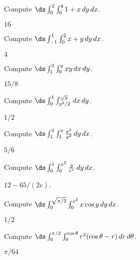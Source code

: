 \begin{exercises}

\begin{exercise} Compute $\ds \int_{0}^{2}\int_{0}^{4} 1+x \,dy\,dx$.
\begin{answer} $16$
\end{answer}\end{exercise}

\begin{exercise} Compute $\ds \int_{-1}^{1}\int_{0}^{2} x+y\,dy\,dx$.
\begin{answer} $4$
\end{answer}\end{exercise}


\begin{exercise} Compute $\ds \int_{1}^{2}\int_{0}^{y} xy \,dx\,dy$.
\begin{answer} $15/8$
\end{answer}\end{exercise}


\begin{exercise} Compute $\ds \int_{0}^{1}\int_{y^2/2}^{\sqrt y} \,dx\,dy$.
\begin{answer} $1/2$
\end{answer}\end{exercise}


\begin{exercise} Compute $\ds \int_{1}^{2}\int_{1}^{x} {x^2\over y^2}\,dy\,dx$.
\begin{answer} $5/6$
\end{answer}\end{exercise}


\begin{exercise} Compute $\ds \int_{0}^{1}\int_{0}^{x^2} {y\over e^x}\,dy\,dx$.
\begin{answer} $12-65/(2e)$.
\end{answer}\end{exercise}


\begin{exercise} Compute $\ds \int_{0}^{\sqrt{\pi/2}}\int_{0}^{x^2} x\cos y\,dy\,dx$.
\begin{answer} $1/2$
\end{answer}\end{exercise}


\begin{exercise} Compute $\ds \int_{0}^{\pi/2}\int_{0}^{\cos\theta}r^2
(\cos\theta-r) \,dr\,d\theta$.
\begin{answer} $\pi/64$
\end{answer}\end{exercise}


\end{exercises}
